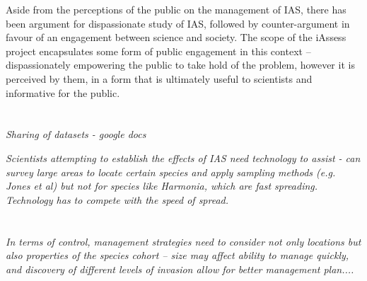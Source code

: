 \documentclass[10pt,psfig,letterpaper,twocolumn]{article}
\begin{document}
Aside from the perceptions of the public on the management of IAS,
there has been argument \cite{Brown:2004uj} for dispassionate study of IAS,
followed by counter-argument \cite{Larson:2007vs} in favour of an engagement between science and society.
The scope of the iAssess project encapsulates some form of public engagement in this context -- dispassionately empowering the public to take hold of the problem,
however it is perceived by them, in a form that is ultimately useful to scientists and informative for the public.

\section*{}

\emph{Sharing of datasets - google docs}

\emph{Scientists attempting to establish the effects of IAS need technology to assist - can survey large areas to locate certain species and apply sampling methods (e.g. Jones et al) but not for species like Harmonia, which are fast spreading. Technology has to compete with the speed of spread.}

\section*{}

\emph{In terms of control, management strategies need to consider not only locations but also properties of the species cohort -- size may affect ability to manage quickly, and discovery of different levels of invasion allow for better management plan....
}

\section*{}


\addtolength{\bibsep}{-2mm}
{\footnotesize
}
\end{document}
